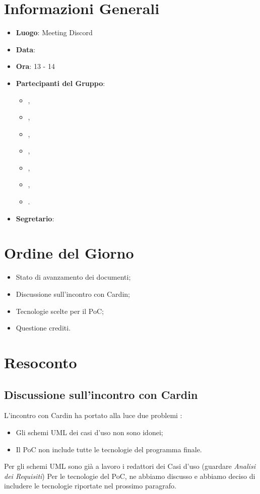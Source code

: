 \section{Informazioni Generali}

\begin{itemize}
\item{\textbf{Luogo}}: Meeting Discord
\item{\textbf{Data}}: \D{}
\item{\textbf{Ora}}: 13 - 14
\item{\textbf{Partecipanti del Gruppo}}: 
	\begin{itemize}
	\item{\EP{},} 
	\item{\FP{},}
	\item{\GC{},}
	\item{\LW{},}
	\item{\MB{},}
	\item{\MG{},}
	\item{\PV{}.}
	\end{itemize} 
\item{\textbf{Segretario}}: \PV{}	
\end{itemize}

\section{Ordine del Giorno}
\begin{itemize}
\item{Stato di avanzamento dei documenti;}
\item{Discussione sull'incontro con Cardin;}
\item{Tecnologie scelte per il PoC;}
\item{Questione crediti.}
\end{itemize}

\section{Resoconto}

\subsection{Discussione sull'incontro con Cardin}
L'incontro con Cardin ha portato alla luce due  problemi : 
\begin{itemize}
\item Gli schemi UML dei casi d'uso non sono idonei;
\item Il PoC non include tutte le tecnologie del programma finale. 
\end{itemize}
Per gli schemi UML sono già a lavoro i redattori dei Casi d'uso (guardare \textit{Analisi dei Requisiti})
Per le tecnologie del PoC, ne abbiamo discusso e abbiamo deciso di includere le tecnologie riportate nel prossimo paragrafo.

